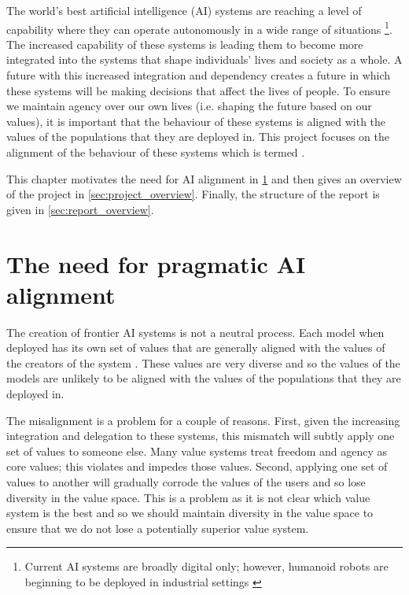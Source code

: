 The world's best artificial intelligence (AI) systems are reaching a level of capability where they can operate autonomously in a wide range of situations \footnote{Current AI systems are broadly digital only; however, humanoid robots are beginning to be deployed in industrial settings \cite{F02ContributedProduction2025}}. The increased capability of these systems is leading them to become more integrated into the systems that shape individuals' lives and society as a whole. A future with this increased integration and dependency creates a future in which these systems will be making decisions that affect the lives of people. To ensure we maintain agency over our own lives (i.e. shaping the future based on our values), it is important that the behaviour of these systems is aligned with the values of the populations that they are deployed in. This project focuses on the alignment of the behaviour of these systems which is termed .

This chapter motivates the need for AI alignment in \ref{sec:motivation} and then gives an overview of the project in \ref{sec:project_overview}. Finally, the structure of the report is given in \ref{sec:report_overview}.

\section{The need for pragmatic AI alignment}
\label{sec:motivation}

The creation of frontier AI systems is not a neutral process. Each model when deployed has its own set of values that are generally aligned with the values of the creators of the system \cite{buylLargeLanguageModels2026,jiAIAlignmentComprehensive2025}. These values are very diverse and so the values of the models are unlikely to be aligned with the values of the populations that they are deployed in.

The misalignment is a problem for a couple of reasons. First, given the increasing integration and delegation to these systems, this mismatch will subtly apply one set of values to someone else. Many value systems treat freedom and agency as core values; this violates and impedes those values. Second, applying one set of values to another will gradually corrode the values of the users and so lose diversity in the value space. This is a problem as it is not clear which value system is the best and so we should maintain diversity in the value space to ensure that we do not lose a potentially superior value system.

